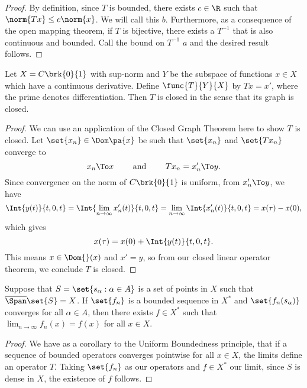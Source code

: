 \documentclass[12pt,letterpaper,twoside]{hmcpset}
\begin{document}
\begin{solution}
  \begin{proof}
    By definition, since $T$ is bounded, there exists $c \in \R$ such that $\norm{Tx} \leq c\norm{x}$.
    We will call this $b$.
    Furthermore, as a consequence of the open mapping theorem, if $T$ is bijective, there exists a $T^{-1}$ that is also continuous and bounded.
    Call the bound on $T^{-1}$ $a$ and the desired result follows.
  \end{proof}
\end{solution}

\begin{problem}[5]
  Let $X = C\brk{0}{1}$ with sup-norm and $Y$ be the subspace of functions $x \in X$ which have a continuous derivative.
  Define $\func{T}{Y}{X}$ by $Tx = x'$, where the prime denotes differentiation.
  Then $T$ is closed in the sense that its graph is closed.
\end{problem}

\begin{solution}
  \begin{proof}
    We can use an application of the Closed Graph Theorem here to show $T$ is closed.
    Let $\set{x_{n}} \in \Dom\pa{x}$ be such that $\set{x_{n}}$ and $\set{Tx_{n}}$ converge to \[
    x_{n} \To x \qquad\text{ and }\qquad Tx_{n} = x_{n}' \To y.
    \]
    Since convergence on the norm of $C\brk{0}{1}$ is uniform, from $x_{n}' \To y$, we have \[
    \Int{y(t)}{t,0,t} = \Int{\lim_{n\to\infty}x_{n}'(t)}{t,0,t} = \lim_{n\to\infty}\Int{x_{n}'(t)}{t,0,t} = x(\tau) - x(0), 
    \]
which gives \[
x(\tau) = x(0) + \Int{y(t)}{t,0,t}.
\]
This means $x \in \Dom{}(x)$ and $x' = y$, so from our closed linear operator theorem, we conclude $T$ is closed.
  \end{proof}
\end{solution}

\begin{problem}[6]
  Suppose that $S = \set{s_{\alpha} : \alpha \in A}$ is a set of points in $X$ such that $\overline{\Span}\set{S} = X$.
  If $\set{f_{n}}$ is a bounded sequence in $X^{*}$ and $\set{f_{n}(s_{\alpha})}$ converges for all $\alpha \in A$, then there exists $f \in X^{*}$ such that $\lim_{n\to\infty} f_{n}(x) = f(x)$ for all $x\in X$.
\end{problem}

\begin{solution}
  \begin{proof}
    We have as a corollary to the Uniform Boundedness principle, that if a sequence of bounded operators converges pointwise for all $x \in X$, the limits define an operator $T$.
    Taking $\set{f_n}$ as our operators and $f \in X^*$ our limit, since $S$ is dense in $X$, the existence of $f$ follows.
  \end{proof}
\end{solution}
\end{document}
